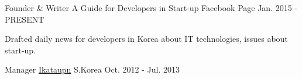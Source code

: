\newcommand*{\link}[2]{\href{#1}{#2\textsuperscript{\faIcon{link}}}}


\begin{cventries}

  \cventry
    {Founder \& Writer} %
    {A Guide for Developers in Start-up} %
    {Facebook Page} %
    {Jan. 2015 - PRESENT} %
    {
      \begin{cvitems} %
        \item {Drafted daily news for developers in Korea about IT technologies, issues about start-up.}
      \end{cvitems}
    }

  \cventry
    {Manager} %
    {\link{https://ikataupn.or.id}{Ikataupn}} %
    {S.Korea} %
    {Oct. 2012 - Jul. 2013} %
    {
    }

\end{cventries}

